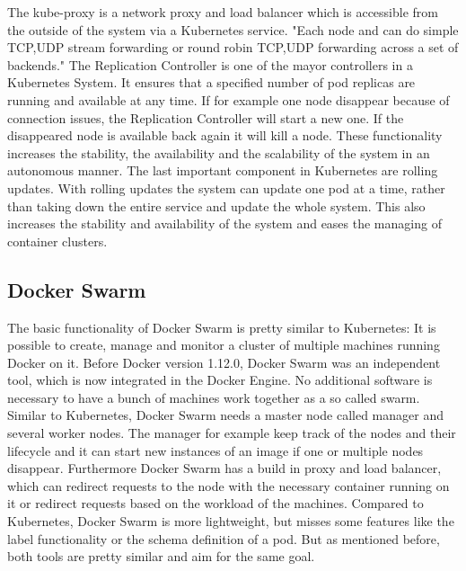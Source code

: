The kube-proxy is a network proxy and load balancer which is accessible from the outside of the system via a Kubernetes service.\autocite[cf.][p. 7]{Mulyana:2016}
"Each node and can do simple TCP,UDP stream forwarding or round robin TCP,UDP forwarding across a set of backends."\autocite{Kubernetes:kube-proxy:2016}
The Replication Controller is one of the mayor controllers in a Kubernetes System.
It ensures that a specified number of pod replicas are running and available at any time.\autocite[cf.]{Kubernetes:replication-controller:2016}
If for example one node disappear because of connection issues, the Replication Controller will start a new one.
If the disappeared node is available back again it will kill a node.
These functionality increases the stability, the availability and the scalability of the system in an autonomous manner.
The last important component in Kubernetes are rolling updates.
With rolling updates the system can update one pod at a time, rather than taking down the entire service and update the whole system.\autocite[cf.]{Kubernetes:rolling-updates:2016}
This also increases the stability and availability of the system and eases the managing of container clusters.

\subsection{Docker Swarm}
The basic functionality of Docker Swarm is pretty similar to Kubernetes: It is possible to create, manage and monitor a cluster of multiple machines running Docker on it.
Before Docker version 1.12.0, Docker Swarm was an independent tool, which is now integrated in the Docker Engine.\autocite[cf.]{dockerSwarm}
No additional software is necessary to have a bunch of machines work together as a so called swarm.
Similar to Kubernetes, Docker Swarm needs a master node called manager and several worker nodes.
The manager for example keep track of the nodes and their lifecycle and it can start new instances of an image if one or multiple nodes disappear.
Furthermore Docker Swarm has a build in proxy and load balancer, which can redirect requests to the node with the necessary container running on it or redirect requests based on the workload of the machines.
Compared to Kubernetes, Docker Swarm is more lightweight, but misses some features like the label functionality or the schema definition of a pod.
But as mentioned before, both tools are pretty similar and aim for the same goal.




